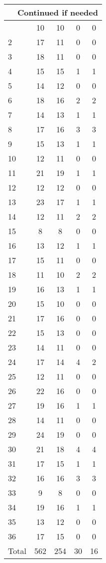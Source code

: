 \begin{center}
\begin{longtable}{l|c|c|c|c}
\hline \multicolumn{5}{|r|}{{Continued if needed}} \\ \hline
\endfoot 
1 & 10 & 10 & 0 & 0\\ \hline
2 & 17 & 11 & 0 & 0\\ \hline
3 & 18 & 11 & 0 & 0\\ \hline
4 & 15 & 15 & 1 & 1\\ \hline
5 & 14 & 12 & 0 & 0\\ \hline
6 & 18 & 16 & 2 & 2\\ \hline
7 & 14 & 13 & 1 & 1\\ \hline
8 & 17 & 16 & 3 & 3\\ \hline
9 & 15 & 13 & 1 & 1\\ \hline
10 & 12 & 11 & 0 & 0\\ \hline
11 & 21 & 19 & 1 & 1\\ \hline
12 & 12 & 12 & 0 & 0\\ \hline
13 & 23 & 17 & 1 & 1\\ \hline
14 & 12 & 11 & 2 & 2\\ \hline
15 & 8 & 8 & 0 & 0\\ \hline
16 & 13 & 12 & 1 & 1\\ \hline
17 & 15 & 11 & 0 & 0\\ \hline
18 & 11 & 10 & 2 & 2\\ \hline
19 & 16 & 13 & 1 & 1\\ \hline
20 & 15 & 10 & 0 & 0\\ \hline
21 & 17 & 16 & 0 & 0\\ \hline
22 & 15 & 13 & 0 & 0\\ \hline
23 & 14 & 11 & 0 & 0\\ \hline
24 & 17 & 14 & 4 & 2\\ \hline
25 & 12 & 11 & 0 & 0\\ \hline
26 & 22 & 16 & 0 & 0\\ \hline
27 & 19 & 16 & 1 & 1\\ \hline
28 & 14 & 11 & 0 & 0\\ \hline
29 & 24 & 19 & 0 & 0\\ \hline
30 & 21 & 18 & 4 & 4\\ \hline
31 & 17 & 15 & 1 & 1\\ \hline
32 & 16 & 16 & 3 & 3\\ \hline
33 & 9 & 8 & 0 & 0\\ \hline
34 & 19 & 16 & 1 & 1\\ \hline
35 & 13 & 12 & 0 & 0\\ \hline
36 & 17 & 15 & 0 & 0\\ \hline
\hline \hline
Total & 562 & 254 & 30 & 16




\end{longtable}
\end{center}

